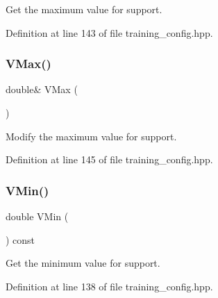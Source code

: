 Get the maximum value for support. 



Definition at line 143 of file training\+\_\+config.\+hpp.

\mbox{\label{classmlpack_1_1rl_1_1TrainingConfig_adcbb11864041e04d884f279313c3ef16}} 
\subsubsection{V\+Max()\hspace{0.1cm}{\footnotesize\ttfamily [2/2]}}
{\footnotesize\ttfamily double\& V\+Max (\begin{DoxyParamCaption}{ }\end{DoxyParamCaption})\hspace{0.3cm}{\ttfamily [inline]}}



Modify the maximum value for support. 



Definition at line 145 of file training\+\_\+config.\+hpp.

\mbox{\label{classmlpack_1_1rl_1_1TrainingConfig_ae19534b553f92ecba4f07efee2d0f3bb}} 
\subsubsection{V\+Min()\hspace{0.1cm}{\footnotesize\ttfamily [1/2]}}
{\footnotesize\ttfamily double V\+Min (\begin{DoxyParamCaption}{ }\end{DoxyParamCaption}) const\hspace{0.3cm}{\ttfamily [inline]}}



Get the minimum value for support. 



Definition at line 138 of file training\+\_\+config.\+hpp.

\mbox{\label{classmlpack_1_1rl_1_1TrainingConfig_ab9a47f972ee65973d0b3b654477fe2c7}} 
